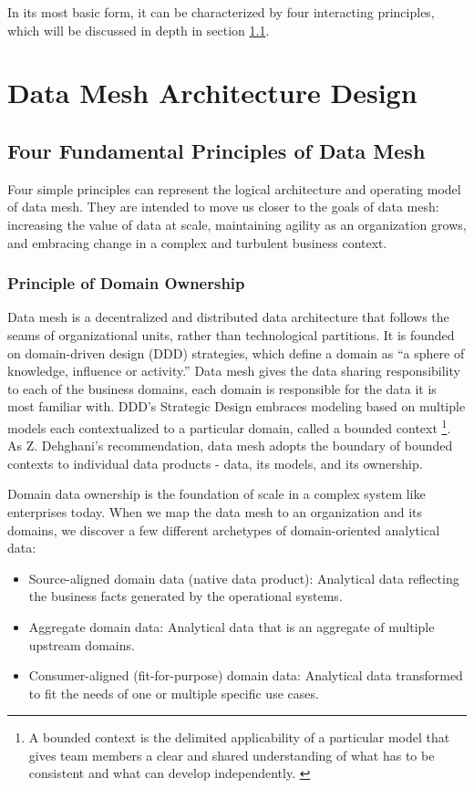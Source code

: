 \documentclass[12pt, a4paper]{book}
\begin{document}
In its most basic form, it can be characterized by four interacting principles, which will be discussed in depth in section \ref{4principles}.

\let\cleardoublepage\clearpage

\chapter{Data Mesh Architecture Design}
\section{Four Fundamental Principles of Data Mesh}\label{4principles}
Four simple principles can represent the logical architecture and operating model of data mesh. They are intended to move us closer to the goals of data mesh: increasing the value of data at scale, maintaining agility as an organization grows, and embracing change in a complex and turbulent business context.

\subsection{Principle of Domain Ownership}
Data mesh is a decentralized and distributed data architecture that follows the seams of organizational units, rather than technological partitions. It is founded on domain-driven design (DDD) strategies, which define a domain as “a sphere of knowledge, influence or activity.” Data mesh gives the data sharing responsibility to each of the business domains, each domain is responsible for the data it is most familiar with. DDD’s Strategic Design embraces modeling based on multiple models each contextualized to a particular domain, called a bounded context \footnote{A bounded context is the delimited applicability of a particular model that gives team members a clear and shared understanding of what has to be consistent and what can develop independently. \cite{dddevan}}. As Z. Dehghani’s recommendation, data mesh adopts the boundary of bounded contexts to individual data products - data, its models, and its ownership.

Domain data ownership is the foundation of scale in a complex system like enterprises today. When we map the data mesh to an organization and its domains, we discover a few different archetypes of domain-oriented analytical data:
	\begin{itemize}[nosep]
		\item Source-aligned domain data (native data product): Analytical data reflecting the business facts generated by the operational systems.
		\item Aggregate domain data: Analytical data that is an aggregate of multiple upstream domains.
		\item Consumer-aligned (fit-for-purpose) domain data: Analytical data transformed to fit the needs of one or multiple specific use cases.
	\end{itemize}
\end{document}
